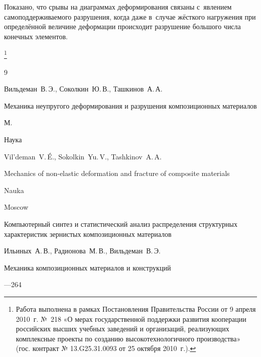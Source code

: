 Показано, что срывы на диаграммах деформирования связаны с~явлением самоподдерживаемого разрушения, когда даже в~случае жёсткого нагружения при определённой величине деформации происходит разрушение большого числа конечных элементов.



\thanks{Работа выполнена  в рамках Постановления Правительства России от 9 апреля 2010~г. №~218 «О мерах государственной поддержки развития кооперации российских высших учебных заведений и организаций, реализующих комплексные проекты по созданию высокотехнологичного производства» (гос. контракт № 13.G25.31.0093 от 25 октября 2010~г.).}



\begin{thebibliography}{9}




\by Вильдеман~В.\,Э., Соколкин~Ю.\,В., Ташкинов~А.\,А.

\book Механика неупругого деформирования и разрушения композиционных материалов

\publaddr М.

\publ Наука



\misctransl

\by Vil'deman~V.\,\'E., Sokolkin~Yu.\,V., Tashkinov~A.\,A.

\book Mechanics of non-elastic deformation and fracture of composite materials

\publ Nauka

\publaddr Moscow 






\paper Компьютерный синтез и статистический анализ распределения структурных характеристик зернистых композиционных материалов 

\by Ильиных~А.\,В., Радионова~М.\,В., Вильдеман~В.\,Э.

\jour Механика композиционных материалов и конструкций 




—264

\misctransl


\end{thebibliography}
